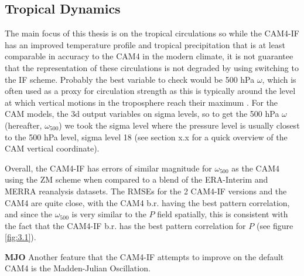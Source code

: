 \documentclass[letterpaper,12pt,titlepage,oneside,final]{book}
\begin{document}
\subsection{Tropical Dynamics}
The main focus of this thesis is on the tropical circulations so while the CAM4-IF has an improved temperature profile and tropical precipitation that is at least comparable in accuracy to the CAM4 in the modern climate, it is not guarantee that the representation of these circulations is not degraded by using switching to the IF scheme. Probably the best variable to check would be 500 hPa $\omega$, which is often used as a proxy for circulation strength as this is typically around the level at which vertical motions in the troposphere reach their maximum \citep{vecchi_global_2007}. For the CAM models, the 3d output variables on sigma levels, so to get the 500 hPa $\omega$ (hereafter, $\omega_{500}$) we took the sigma level where the pressure level is usually closest to the 500 hPa level, sigma level 18 (see section x.x for a quick overview of the CAM vertical coordinate). 

Overall, the CAM4-IF has errors of similar magnitude for $\omega_{500}$ as the CAM4 using the ZM scheme when compared to a blend of the ERA-Interim and MERRA reanalysis datasets. The RMSEs for the 2 CAM4-IF versions and the CAM4 are quite close, with the CAM4 b.r. having the best pattern correlation, and since the $\omega_{500}$ is very similar to the $P$ field spatially, this is consistent with the fact that the CAM4-IF b.r. has the best pattern correlation for $P$ (see figure \ref{fig:3.1}).

\textbf{MJO}
Another feature that the CAM4-IF attempts to improve on the default CAM4 is the Madden-Julian Oscillation. 
\end{document}
